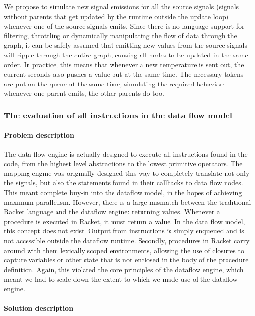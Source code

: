 We propose to simulate new signal emissions for all the source signals (signals without parents that get updated by the runtime outside the update loop) whenever one of the source signals emits. Since there is no language support for filtering, throttling or dynamically manipulating the flow of data through the graph, it can be safely assumed that emitting new values from the source signals will ripple through the entire graph, causing all nodes to be updated in the same order. In practice, this means that whenever a new temperature is sent out, the current seconds also pushes a value out at the same time. The necessary tokens are put on the queue at the same time, simulating the required behavior: whenever one parent emits, the other parents do too.

\subsubsection{The evaluation of all instructions in the data flow model}

\paragraph{Problem description}

The data flow engine is actually designed to execute all instructions found in the code, from the highest level abstractions to the lowest primitive operators. The mapping engine was originally designed this way to completely translate not only the signals, but also the statements found in their callbacks to data flow nodes. This meant complete buy-in into the dataflow model, in the hopes of achieving maximum parallelism. However, there is a large mismatch between the traditional Racket language and the dataflow engine: returning values. Whenever a procedure is executed in Racket, it must return a value. In the data flow model, this concept does not exist. Output from instructions is simply enqueued and is not accessible outside the dataflow runtime. Secondly, procedures in Racket carry around with them lexically scoped environments, allowing the use of closures to capture variables or other state that is not enclosed in the body of the procedure definition. 
Again, this violated the core principles of the dataflow engine, which meant we had to scale down the extent to which we made use of the dataflow engine. 

\paragraph{Solution description}


